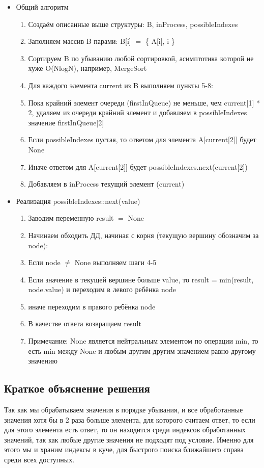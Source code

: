 \begin{itemize}

    \item Общий алгоритм
    \begin{enumerate}
        \item Создаём описанные выше структуры: B, inProcess, possibleIndexes
        \item Заполняем массив B парами: B[i] $=$ \{ A[i], i \}
        \item Сортируем B по убыванию любой сортировкой, асимптотика которой не хуже O(NlogN), например, MergeSort
        \item Для каждого элемента current из B выполняем пункты 5-8:
        \item Пока крайний элемент очереди (firstInQueue) не меньше, чем current[1] * 2, удаляем из очереди крайний элемент и добавляем в possibleIndexes значение firstInQueue[2]
        \item Если possibleIndexes пустая, то ответом для элемента A[current[2]] будет None
        \item Иначе ответом для A[current[2]] будет possibleIndexes.next(current[2])
        \item Добавляем в inProcess текущий элемент (current)
    \end{enumerate}

    \item Реализация possibleIndexes::next(value)
    \begin{enumerate}
        \item Заводим переменную result $=$ None
        \item Начинаем обходить ДД, начиная с корня (текущую вершину обозначим за node):
        \item Если node $\neq$ None выполняем шаги 4-5
        \item Если значение в текущей вершине больше value, то result = min(result, node.value) и переходим в левого ребёнка node
        \item иначе переходим в правого ребёнка node
        \item В качестве ответа возвращаем result
        \item Примечание: None является нейтральным элементом по операции min, то есть min между None и любым другим другим значением равно другому значению
    \end{enumerate}
\end{itemize}

\subsection{Краткое объяснение решения}
Так как мы обрабатываем значения в порядке убывания, и все обработанные значения хотя бы в 2 раза больше элемента, для которого считаем ответ, то если для этого элемента есть ответ, то он находится среди индексов обработанных значений, так как любые другие значения не подходят под условие. Именно для этого мы и храним индексы в куче, для быстрого поиска ближайшего справа среди всех доступных.

